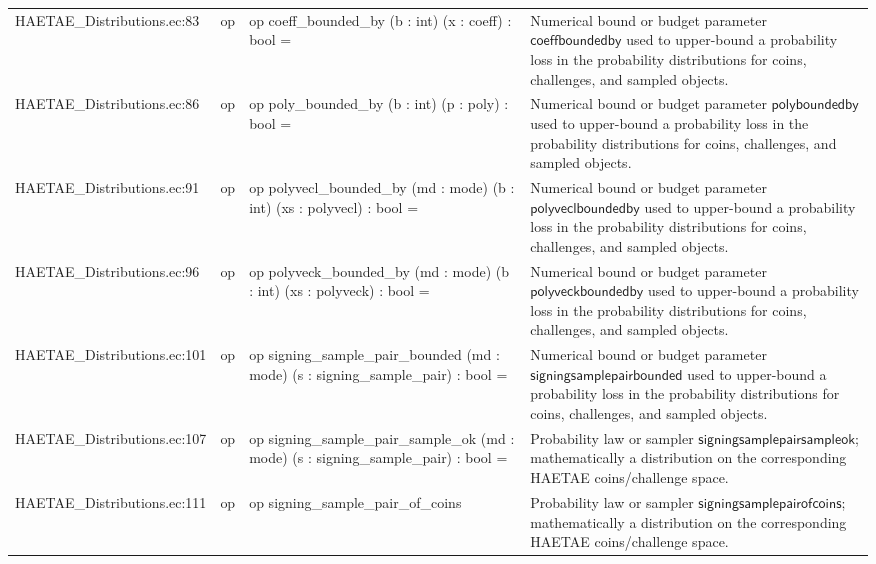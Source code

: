 \documentclass[10pt]{article}
\begin{document}
\begin{longtable}{L{0.11\textwidth}L{0.055\textwidth}L{0.385\textwidth}L{0.41\textwidth}}
HAETAE\_\allowbreak{}Distributions.\allowbreak{}ec:\allowbreak{}83 & op & {\ttfamily\scriptsize op coeff\_\allowbreak{}bounded\_\allowbreak{}by (b : int) (x : coeff) : bool =} & Numerical bound or budget parameter $\mathsf{coeffboundedby}$ used to upper-bound a probability loss in the probability distributions for coins, challenges, and sampled objects. \\
HAETAE\_\allowbreak{}Distributions.\allowbreak{}ec:\allowbreak{}86 & op & {\ttfamily\scriptsize op poly\_\allowbreak{}bounded\_\allowbreak{}by (b : int) (p : poly) : bool =} & Numerical bound or budget parameter $\mathsf{polyboundedby}$ used to upper-bound a probability loss in the probability distributions for coins, challenges, and sampled objects. \\
HAETAE\_\allowbreak{}Distributions.\allowbreak{}ec:\allowbreak{}91 & op & {\ttfamily\scriptsize op polyvecl\_\allowbreak{}bounded\_\allowbreak{}by (md : mode) (b : int) (xs : polyvecl) : bool =} & Numerical bound or budget parameter $\mathsf{polyveclboundedby}$ used to upper-bound a probability loss in the probability distributions for coins, challenges, and sampled objects. \\
HAETAE\_\allowbreak{}Distributions.\allowbreak{}ec:\allowbreak{}96 & op & {\ttfamily\scriptsize op polyveck\_\allowbreak{}bounded\_\allowbreak{}by (md : mode) (b : int) (xs : polyveck) : bool =} & Numerical bound or budget parameter $\mathsf{polyveckboundedby}$ used to upper-bound a probability loss in the probability distributions for coins, challenges, and sampled objects. \\
HAETAE\_\allowbreak{}Distributions.\allowbreak{}ec:\allowbreak{}101 & op & {\ttfamily\scriptsize op signing\_\allowbreak{}sample\_\allowbreak{}pair\_\allowbreak{}bounded (md : mode) (s : signing\_\allowbreak{}sample\_\allowbreak{}pair) : bool =} & Numerical bound or budget parameter $\mathsf{signingsamplepairbounded}$ used to upper-bound a probability loss in the probability distributions for coins, challenges, and sampled objects. \\
HAETAE\_\allowbreak{}Distributions.\allowbreak{}ec:\allowbreak{}107 & op & {\ttfamily\scriptsize op signing\_\allowbreak{}sample\_\allowbreak{}pair\_\allowbreak{}sample\_\allowbreak{}ok (md : mode) (s : signing\_\allowbreak{}sample\_\allowbreak{}pair) : bool =} & Probability law or sampler $\mathsf{signingsamplepairsampleok}$; mathematically a distribution on the corresponding HAETAE coins/challenge space. \\
HAETAE\_\allowbreak{}Distributions.\allowbreak{}ec:\allowbreak{}111 & op & {\ttfamily\scriptsize op signing\_\allowbreak{}sample\_\allowbreak{}pair\_\allowbreak{}of\_\allowbreak{}coins} & Probability law or sampler $\mathsf{signingsamplepairofcoins}$; mathematically a distribution on the corresponding HAETAE coins/challenge space. \\

\end{longtable}
\end{document}
